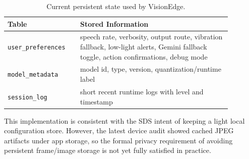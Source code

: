 \documentclass[conference]{IEEEtran}
\newcommand{\codeid}[1]{\begingroup\urlstyle{tt}\nolinkurl{#1}\endgroup}
\begin{document}
\begin{table}[!t]
\centering
\begin{tabular}{p{0.28\linewidth} p{0.60\linewidth}}
\toprule
Table & Stored Information \\
\midrule
\codeid{user_preferences} & speech rate, verbosity, output route, vibration fallback, low-light alerts, Gemini fallback toggle, action confirmations, debug mode \\
\codeid{model_metadata} & model id, type, version, quantization/runtime label \\
\codeid{session_log} & short recent runtime logs with level and timestamp \\
\bottomrule
\end{tabular}
\caption{Current persistent state used by VisionEdge.}
\label{tab:dbschema}
\end{table}

This implementation is consistent with the SDS intent of keeping a light local configuration store. However, the latest device audit showed cached JPEG artifacts under app storage, so the formal privacy requirement of avoiding persistent frame/image storage is not yet fully satisfied in practice.
\end{document}
